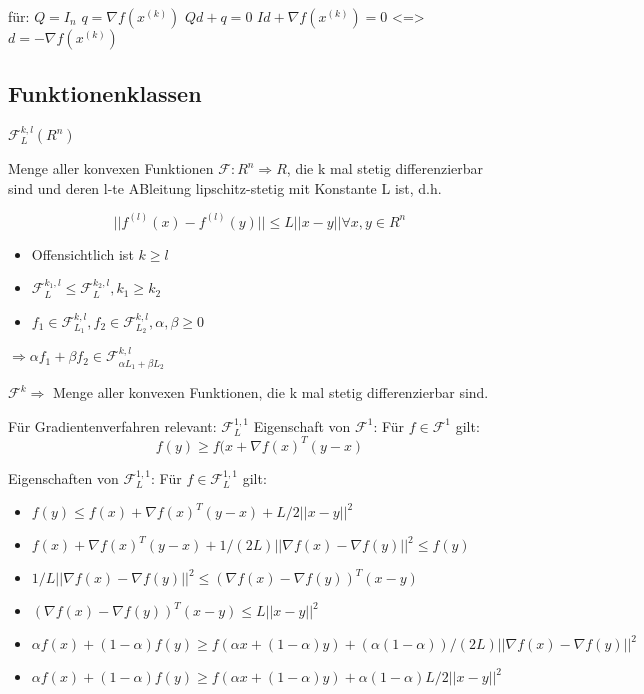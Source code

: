 für: $Q=I_n$
$q = \nabla f(x^{(k)})$
$Qd + q = 0$
$Id + \nabla f(x^{(k)}) = 0$   <=> $d=-\nabla f(x^{(k)})$

\subsection{Funktionenklassen}	

$\mathcal{F}_L^{k,l} (R^n)$

Menge aller konvexen Funktionen	$\mathcal{F}:R^n \Rightarrow R$, die k mal stetig differenzierbar sind und deren l-te ABleitung lipschitz-stetig mit Konstante L ist, d.h.

\begin{equation}
||f^{(l)} (x) - f^{(l)} (y)|| \leq L ||x-y|| \forall x,y \in R^n
\end{equation}

\begin{itemize}
	\item Offensichtlich ist $k \geq l$
	\item $\mathcal{F}_L^{k_1,l} \leq \mathcal{F}_L^{k_2,l}, k_1 \geq k_2$
	\item $f_1 \in \mathcal{F}_{L_1}^{k,l}, f_2 \in \mathcal{F}_{L_2}^{k,l}, \alpha, \beta \geq 0$
\end{itemize}

$\Rightarrow \alpha f_1 + \beta f_2 \in \mathcal{F}_{\alpha L_1 + \beta L_2}^{k,l}$


$\mathcal{F}^k \Rightarrow$ Menge aller konvexen Funktionen, die k mal stetig differenzierbar sind.

Für Gradientenverfahren relevant:   $\mathcal{F}^{1,1}_L$
Eigenschaft von $\mathcal{F}^1$: Für $f \in \mathcal{F}^1$ gilt:\\

\begin{equation}
	f(y) \geq f(x+ \nabla f(x)^T (y-x)
\end{equation}

Eigenschaften von $\mathcal{F}^{1,1}_L$: Für $f \in \mathcal{F}^{1,1}_L$ gilt:\\
\begin{itemize}
	\item $f(y) \leq f(x) + \nabla f(x)^T (y-x) + L/2 ||x-y||^2$
	\item $f(x) + \nabla f(x)^T (y-x) + 1/(2L) || \nabla f(x) - \nabla f(y)||^2 \leq f(y)$
	\item $ 1/L || \nabla f(x) - \nabla f(y)||^2 \leq (\nabla f(x) - \nabla f(y))^T (x-y)$
	\item $(\nabla f(x) - \nabla f(y))^T (x-y) \leq L ||x-y||^2$
	\item $ \alpha f(x) + (1-\alpha) f(y) \geq f(\alpha x + (1-\alpha)y) + (\alpha(1-\alpha))/(2L) || \nabla f(x) - \nabla f(y)||^2$
	\item $\alpha f(x) + (1-\alpha) f(y) \geq f(\alpha x + (1-\alpha)y) + \alpha (1-\alpha) L/2 ||x-y||^2$
\end{itemize}

